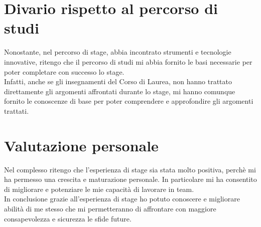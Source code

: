 \section{Divario rispetto al percorso di studi}
Nonostante, nel percorso di stage, abbia incontrato strumenti e tecnologie innovative, ritengo che il percorso di studi 
mi abbia fornito le basi necessarie per poter completare con successo lo stage.\\
Infatti, anche se gli insegnamenti del Corso di Laurea, non hanno trattato direttamente gli argomenti affrontati durante lo stage,
mi hanno comunque fornito le conoscenze di base per poter comprendere e approfondire gli argomenti trattati.
\section{Valutazione personale}
Nel complesso ritengo che l'esperienza di stage sia stata molto positiva, perchè 
mi ha permesso una crescita e maturazione personale. In particolare mi ha consentito di
migliorare e potenziare le mie capacità di lavorare in team.\\
In conclusione grazie all'esperienza di stage ho potuto conoscere e migliorare abilità di me stesso
 che mi permetteranno di affrontare con maggiore consapevolezza e sicurezza le sfide future.\\
\newpage
\pagestyle{empty}
\null %
\newpage